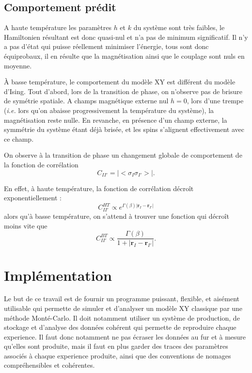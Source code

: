 \documentclass[a4paper, 11pt]{article}
\newcommand{\vr}{\bm{r}}
\begin{document}
\subsection{Comportement prédit}

A haute température les paramètres $h$ et $k$ du système sont très faibles, le Hamiltonien résultant
est donc quasi-nul et n'a pas de minimum significatif. Il n'y a pas d'état qui puisse réellement
minimiser l'énergie, tous sont donc équiprobaux, il en résulte que la magnétisation ainsi que le
couplage sont nuls en moyenne.

À basse température, le comportement du modèle XY est différent du modèle d'Ising. Tout d'abord, lors
de la transition de phase, on n'observe pas de brisure de symétrie spatiale. A champs magnétique
externe nul $h=0$, lors d'une trempe (\emph{i.e.} lors qu'on abaisse progressivement la température du
système), la magnétisation reste nulle. En revanche, en présence d'un champ externe, la symmétrie du
système étant déjà brisée, et les spins s'alignent effectivement avec ce champ. 

On observe à la transition de phase un changement globale de comportement de la fonction de corrélation
\begin{equation}
    C_{II'} = \big|\big< \sigma_I \sigma_{I'} \big>\big|.
\end{equation}

En effet, à haute température, la fonction de corrélation décroît exponentiellement :
\begin{equation}
    C_{II'}^{HT} \propto e^{\Gamma(\beta) |\vr_I - \vr_{I'}|}
\end{equation}
alors qu'à basse température, on s'attend à trouver une fonction qui décroît moins vite que 
\begin{equation}
    C_{II'}^{BT} \propto \frac{\Gamma(\beta)}{1+|\vr_I - \vr_{I'}|}.
\end{equation}



\section{Implémentation}

Le but de ce travail est de fournir un programme puissant, flexible, et aisément utilisable qui
permette de simuler et d'analyser un modèle XY classique par une méthode Monté-Carlo. Il doit
notamment utiliser un système de production, de stockage et d'analyse des données cohérent qui
permette de reproduire chaque experience. Il faut donc notamment ne pas écraser les données au fur
et à mesure qu'elles sont produite, mais il faut en plus garder des traces des paramètres associés à
chaque experience produite, ainsi que des conventions de nomages compréhensibles et cohérentes.
\end{document}
